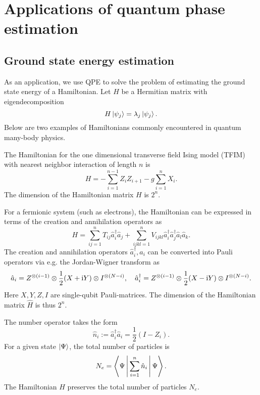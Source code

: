 \chapter{Applications of quantum phase estimation}\label{chap:app_qpe}

\section{Ground state energy estimation}\label{sec:groundenergy}

As an application, we use QPE to solve the problem of estimating the ground state energy of a Hamiltonian. 
Let $H$ be a Hermitian matrix with eigendecomposition
\begin{equation}
H\ket{\psi_j}=\lambda_j \ket{\psi_j}.
\end{equation}
Below are two examples of Hamiltonians commonly encountered in quantum many-body physics.
\begin{exam}
The Hamiltonian for the one dimensional transverse field Ising model (TFIM) with nearest neighbor interaction of length $n$ is
\begin{equation}\label{eqn:ham_tfim}
H=-\sum_{i=1}^{n-1} Z_iZ_{i+1}-g\sum_{i=1}^n X_i.
\end{equation}
The dimension of the Hamiltonian matrix $H$ is $2^n$. 
\end{exam}

\begin{exam}
\label{exam:fermion_hamiltonian}
For a fermionic system (such as electrons), the Hamiltonian can be expressed in terms of the creation and annihilation operators as
\begin{equation}
H=\sum_{ij=1}^{n} T_{ij} \hat{a}_{i}^{\dagger} \hat{a}_{j}+\sum_{ijkl=1}^{n} V_{ijkl} \hat{a}_i^{\dagger}\hat{a}_j^{\dagger}\hat{a}_l \hat{a}_k.
\label{eqn:fermion_hamiltonian}
\end{equation}
The creation and annihilation operators $\hat{a}^{\dag}_i,\hat{a}_i$ can be converted into Pauli operators via e.g. the Jordan-Wigner transform as
\begin{equation}
\hat{a}_{i}=Z^{\otimes (i-1)}\otimes\frac12(X+\mathrm{i} Y)\otimes I^{\otimes (N-i)}, \quad \hat{a}^{\dagger}_i=Z^{\otimes (i-1)}\otimes\frac12(X-\mathrm{i} Y)\otimes I^{\otimes (N-i)}.
\label{eqn:jordan_wigner}
\end{equation}
Here $X,Y,Z,I$ are single-qubit Pauli-matrices.  
The dimension of the Hamiltonian matrix $\hat{H}$ is thus $2^n$. 


The number operator takes the form
\begin{equation}
    \hat{n}_{i}:=\hat{a}^{\dag}_{i}\hat{a}_{i}=\frac12 (I-Z_{i}).
    \label{eq:ndecomp}
\end{equation}
For a given state $\ket{\Psi}$, the total number of particles is
\begin{equation}
N_e=\Braket{\Psi|\sum_{i=1}^n \hat{n}_i|\Psi}.
\end{equation}
The Hamiltonian $H$ preserves the total number of particles $N_e$.
\end{exam}

